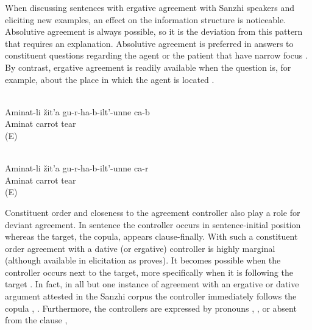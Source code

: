 When discussing sentences with ergative agreement with Sanzhi speakers and eliciting new examples, an effect on the information structure is noticeable. Absolutive agreement is always possible, so it is the deviation from this pattern that requires an explanation. Absolutive agreement is preferred in answers to constituent questions regarding the agent or the patient that have narrow focus . By contrast, ergative agreement is readily available when the question is, for example, about the place in which the agent is located .
%
\begin{exe}
	\ex	\label{ex:Aminat and the carrots@16}
	\begin{xlist}
		\\	\label{ex:Aminat is tearing out a carrot from under the earth@16a}
		\gll	Aminat-li	žit'a	gu-r-ha-b-ilt'-unne ca-b\\
			Aminat	carrot	tear \\
		\glt	{} (E)

		\\	\label{ex:Aminat is tearing out a carrot from under the earth@16b}
		\gll	Aminat-li	žit'a	gu-r-ha-b-ilt'-unne ca-r\\
			Aminat	carrot	tear \\
		\glt	{} (E)
	\end{xlist}
\end{exe}

Constituent order and closeness to the agreement controller also play a role for deviant agreement. In sentence  the controller occurs in sentence-initial position whereas the target, the copula, appears clause-finally. With such a constituent order agreement with a dative (or ergative) controller is highly marginal (although available in elicitation as  proves). It becomes possible when the controller occurs next to the target, more specifically when it is following the target . In fact, in all but one instance of agreement with an ergative or dative argument attested in the Sanzhi corpus the controller immediately follows the copula , . Furthermore, the controllers are expressed by pronouns , , or absent from the clause , 


